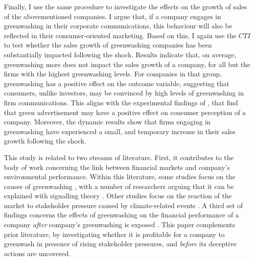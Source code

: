 \documentclass[12pt]{article}
\begin{document}
Finally, I use the same procedure to investigate the effects on the growth of sales of the abovementioned companies. I argue that, if a company engages in greenwashing in their corporate communications, this behaviour will also be reflected in their consumer-oriented marketing. Based on this, I again use the $CTI$ to test whether the sales growth of greenwashing companies has been substantially impacted following the shock. Results indicate that, on average, greenwashing more does not impact the sales growth of a company, for all but the firms with the highest greenwashing levels. For companies in that group, greenwashing has a positive effect on the outcome variable, suggesting that consumers, unlike investors, may be convinced by high levels of greenwashing in firm communications. This aligns with the experimental findings of \textcite{schmuckMisleadingConsumersGreen2018,parguelCanEvokingNature2015}, that find that green advertisement may have a positive effect on consumer perception of a company. Moreover, the dynamic results show that firms engaging in greenwashing have experienced a small, and temporary increase in their sales growth following the shock. 

This study is related to two streams of literature. First, it contributes to the body of work concerning the link between financial markets and company's environmental performance. Within this literature, some studies focus on the causes of greenwashing \parencite{duchinSustainabilityGreenwashingEvidence2025, servaesImpactCorporateSocial2013,berroneDoesGreenwashingPay2017,kimGreenwashVsBrownwash2015,testaDoesItPay2018}, with a number of researchers arguing that it can be explained with signalling theory \parencite{lyonGreenwashCorporateEnvironmental2011,wuBadGreenwashingGood2020}. Other studies focus on the reaction of the market to stakeholder pressure caused by climate-related events \parencite{birindelliJustBlahBlah2023,schusterStockPriceReactions2023, diaz-raineyTrumpVsParis2021, bouzzineStockPriceReactions2021,cartellierCanInvestorsCurb2023, }. A third set of findings concerns the effects of greenwashing on the financial performance of a company \textit{after} company's greenwashing is exposed \parencite{tetiDoesGreenwashingAffect2024, karpoffReputationalPenaltiesEnvironmental2005, konarDoesMarketValue2001,torelliGreenwashingEnvironmentalCommunication2020}. This paper complements prior literature, by investigating whether it is profitable for a company to greenwash in presence of rising stakeholder pressures, and \textit{before} its deceptive actions are uncovered.
\end{document}
